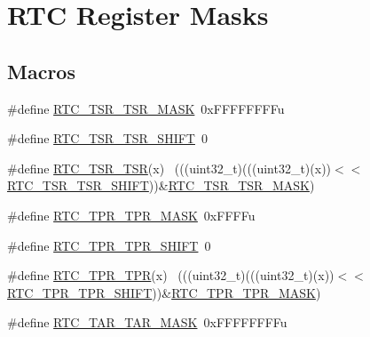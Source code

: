 \hypertarget{group___r_t_c___register___masks}{}\section{R\+TC Register Masks}
\label{group___r_t_c___register___masks}
\subsection*{Macros}
\begin{DoxyCompactItemize}
\item 
\#define \hyperlink{group___r_t_c___register___masks_ga9a0f8842e8262ca176fcf028982153af}{R\+T\+C\+\_\+\+T\+S\+R\+\_\+\+T\+S\+R\+\_\+\+M\+A\+SK}~0x\+F\+F\+F\+F\+F\+F\+F\+Fu
\item 
\#define \hyperlink{group___r_t_c___register___masks_gad0476d1e39a866b5b5ba4728b55e258a}{R\+T\+C\+\_\+\+T\+S\+R\+\_\+\+T\+S\+R\+\_\+\+S\+H\+I\+FT}~0
\item 
\#define \hyperlink{group___r_t_c___register___masks_ga77fdb2a31f6b8644e3784f5cd65bb52b}{R\+T\+C\+\_\+\+T\+S\+R\+\_\+\+T\+SR}(x)                                                  ~(((uint32\+\_\+t)(((uint32\+\_\+t)(x))$<$$<$\hyperlink{group___r_t_c___register___masks_gad0476d1e39a866b5b5ba4728b55e258a}{R\+T\+C\+\_\+\+T\+S\+R\+\_\+\+T\+S\+R\+\_\+\+S\+H\+I\+FT}))\&\hyperlink{group___r_t_c___register___masks_ga9a0f8842e8262ca176fcf028982153af}{R\+T\+C\+\_\+\+T\+S\+R\+\_\+\+T\+S\+R\+\_\+\+M\+A\+SK})
\item 
\#define \hyperlink{group___r_t_c___register___masks_ga2682f687fa561be2f002fc574d48cc79}{R\+T\+C\+\_\+\+T\+P\+R\+\_\+\+T\+P\+R\+\_\+\+M\+A\+SK}~0x\+F\+F\+F\+Fu
\item 
\#define \hyperlink{group___r_t_c___register___masks_ga624a290f73478b3ca2687ac49cc78fb2}{R\+T\+C\+\_\+\+T\+P\+R\+\_\+\+T\+P\+R\+\_\+\+S\+H\+I\+FT}~0
\item 
\#define \hyperlink{group___r_t_c___register___masks_gaa16b7c11dc2683ecd02be0f187100e98}{R\+T\+C\+\_\+\+T\+P\+R\+\_\+\+T\+PR}(x)                                                  ~(((uint32\+\_\+t)(((uint32\+\_\+t)(x))$<$$<$\hyperlink{group___r_t_c___register___masks_ga624a290f73478b3ca2687ac49cc78fb2}{R\+T\+C\+\_\+\+T\+P\+R\+\_\+\+T\+P\+R\+\_\+\+S\+H\+I\+FT}))\&\hyperlink{group___r_t_c___register___masks_ga2682f687fa561be2f002fc574d48cc79}{R\+T\+C\+\_\+\+T\+P\+R\+\_\+\+T\+P\+R\+\_\+\+M\+A\+SK})
\item 
\#define \hyperlink{group___r_t_c___register___masks_ga649a76416ad00079054bd866565dada2}{R\+T\+C\+\_\+\+T\+A\+R\+\_\+\+T\+A\+R\+\_\+\+M\+A\+SK}~0x\+F\+F\+F\+F\+F\+F\+F\+Fu

\end{DoxyCompactItemize}

